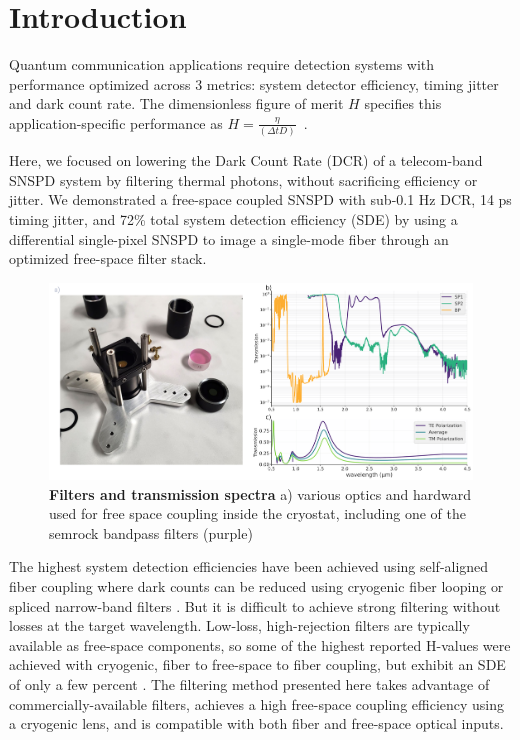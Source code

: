 \documentclass[11pt]{caltech_thesis} %
\begin{document}
\hypertarget{introduction-1}{%
\section{Introduction}\label{introduction-1}}

Quantum communication applications require detection systems with performance optimized across 3 metrics: system detector efficiency, timing jitter and dark count rate. The dimensionless figure of merit $H$ specifies this application-specific performance as $H = \frac{\eta}{(\Delta t D)}$~\autocite{Hadfield2009}.

Here, we focused on lowering the Dark Count Rate (DCR) of a telecom-band SNSPD system by filtering thermal photons, without sacrificing efficiency or jitter. We demonstrated a free-space coupled SNSPD with sub-0.1 Hz DCR, 14 ps timing jitter, and 72\% total system detection efficiency (SDE) by using a differential single-pixel SNSPD \autocite{Colangelo2021} to image a single-mode fiber through an optimized free-space filter stack.

\hypertarget{fig:dcrmin_filters}{%
\begin{figure}
\centering
\includegraphics[width=1\textwidth,height=\textheight]{./chapter_02/figs/dcrmin_filters_light.pdf}
\caption[{Filters and transmission spectra}]{\textbf{Filters and transmission spectra} a) various optics and hardward used for free space coupling inside the cryostat, including one of the semrock bandpass filters (purple)}
\label{fig:dcrmin_filters}
\end{figure}
}

The highest system detection efficiencies have been achieved using self-aligned fiber coupling where dark counts can be reduced using cryogenic fiber looping \autocite{Cohen2015} or spliced narrow-band filters \autocite{Boaron2018secure}. But it is difficult to achieve strong filtering without losses at the target wavelength. Low-loss, high-rejection filters are typically available as free-space components, so some of the highest reported H-values were achieved with cryogenic, fiber to free-space to fiber coupling, but exhibit an SDE of only a few percent \autocite{Shibata2015}. The filtering method presented here takes advantage of commercially-available filters, achieves a high free-space coupling efficiency using a cryogenic lens, and is compatible with both fiber and free-space optical inputs.
\end{document}
